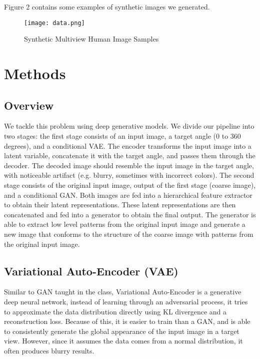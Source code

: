 \documentclass[10pt,conference]{IEEEtran}
\begin{document}
Figure 2 contains some examples of synthetic images we generated.

\begin{figure}[htbp]
\centering
\texttt{[image: data.png]}
\caption{Synthetic Multiview Human Image Samples}
\end{figure}



\section{Methods}

\subsection{Overview}

We tackle this problem using deep generative models. We divide our pipeline into two stages: the first stage consists of an input image, a target angle (0 to 360 degrees), and a conditional VAE. The encoder transforms the input image into a latent variable, concatenate it with the target angle, and passes them through the decoder. The decoded image should resemble the input image in the target angle, with noticeable artifact (e.g. blurry, sometimes with incorrect colors). The second stage consists of the original input image, output of the first stage (coarse image), and a conditional GAN. Both images are fed into a hierarchical feature extractor to obtain their latent representations. These latent representations are then concatenated and fed into a generator to obtain the final output. The generator is able to extract low level patterns from the original input image and generate a new image that conforms to the structure of the coarse image with patterns from the original input image.

\subsection{Variational Auto-Encoder (VAE)}

Similar to GAN taught in the class, Variational Auto-Encoder is a generative deep neural network, instead of learning through an adversarial process, it tries to approximate the data distribution directly using KL divergence and a reconstruction loss. Because of this, it is easier to train than a GAN, and is able to consistently generate the global appearance of the input image in a target view. However, since it assumes the data comes from a normal distribution, it often produces blurry results. 
\end{document}
